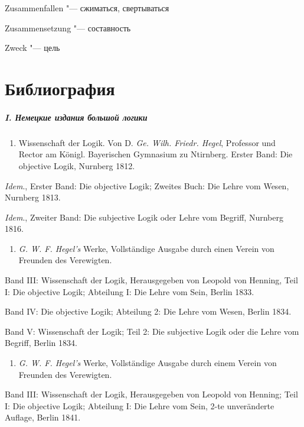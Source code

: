 {{\begin{multicols}{2}
Zusammenfallen "--- сжиматься, свертываться

Zusammensetzung "--- составность

Zweck "--- цель
\end{multicols}

\bigskip

\clearpage
\chapter[Библиография]{Библиография}
\paragraph[I. Немецкие издания большой логики]
{I. Немецкие издания большой логики}

\begin{enumerate}
\item
Wissenschaft der Logik. Von D. {\em Ge. Wilh. Friedr. Hegel},
Professor und Rector am Königl. Bayerischen Gymnasium zu Ntirnberg.
Erster Band: Die objective Logik, Nurnberg 1812.
\end{enumerate}

{\em Idem}., Erster Band: Die objective Logik; Zweites Buch: Die Lehre
vom Wesen, Nurnberg 1813.

{\em Idem}., Zweiter Band: Die subjective Logik oder Lehre vom Begriff,
Nurnberg 1816.

\begin{enumerate}
\item
{\em G. W. F. Hegel's} Werke, Vollständige Ausgabe durch einen Verein von
Freunden des Verewigten.
\end{enumerate}

Band III: Wissenschaft der Logik, Herausgegeben von
Leopold von Henning, Teil I: Die objective Logik; Abteilung I: Die Lehre
vom Sein, Berlin 1833.

Band IV: Die objective Logik; Abteilung 2: Die Lehre vom Wesen, Berlin 1834.

Band V: Wissenschaft der Logik; Teil 2: Die subjective Logik oder die Lehre
vom Begriff, Berlin 1834.

\begin{enumerate}
\item
{\em G. W. F. Hegel's} Werke, Vollständige Ausgabe durch einem Verein von
Freunden des Verewigten.
\end{enumerate}

Band III: Wissenschaft der Logik, Herausgegeben von Leopold von Henning;
Teil I: Die objective Logik; Abteilung I: Die Lehre vom Sein, 2-te
unveränderte Auflage, Berlin 1841.

}}
